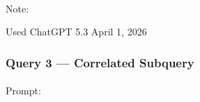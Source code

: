 \documentclass[
  letterpaper,
  DIV=11,
  numbers=noendperiod]{scrartcl}
\makeatletter
\let\oldparagraph\paragraph
\renewcommand{\paragraph}{
    \@ifstar
      \xxxParagraphStar
      \xxxParagraphNoStar
  }
\newcommand{\xxxParagraphStar}[1]{\oldparagraph*{#1}\mbox{}}
\newcommand{\xxxParagraphNoStar}[1]{\oldparagraph{#1}\mbox{}}
\makeatother
\begin{document}
\paragraph{Note:}\label{note-1}

Used ChatGPT 5.3 April 1, 2026

\subsubsection{\texorpdfstring{\textbf{Query 3 ---} Correlated
Subquery}{Query 3 --- Correlated Subquery}}\label{query-3-correlated-subquery}

\paragraph{Prompt:}\label{prompt-2}
\end{document}

